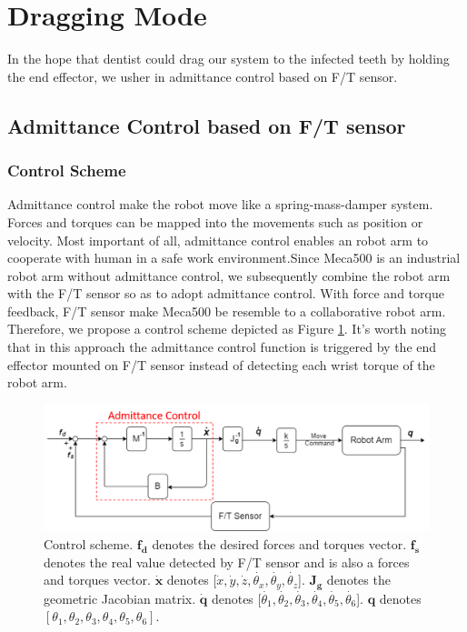 \section{Dragging Mode}
In the hope that dentist could drag our system to the infected teeth by holding the end effector, we usher in admittance control based on F/T sensor.
\subsection{Admittance Control based on F/T sensor}
\label{sec:adm ctrl}
\subsubsection{Control Scheme}
Admittance control make the robot move like a spring-mass-damper system. Forces and torques can be mapped into the movements such as position or velocity. Most important of all, admittance control enables an robot arm to cooperate with human in a safe work environment.Since Meca500 is an industrial robot arm without admittance control, we subsequently combine the robot arm with the F/T sensor so as to adopt admittance control. With force and torque feedback, F/T sensor make Meca500 be resemble to a collaborative robot arm. Therefore, we propose a control scheme depicted as Figure \ref{fig:adm ctrl}. It's worth noting that in this approach the admittance control function is triggered by the end effector mounted on F/T sensor instead of detecting each wrist torque of the robot arm.
\par
\begin{figure}[htbp]
\begin{center}
\includegraphics[width=1\linewidth]{Images/adm ctrl.png}
\end{center}
\caption{
Control scheme. $\boldsymbol{f_d}$ denotes the desired forces and torques vector. $\boldsymbol{f_s}$ denotes the real value detected by F/T sensor and is also a forces and torques vector. $\boldsymbol{\dot{x}}$ denotes [$\dot{x}, \dot{y}, \dot{z}, \dot{\theta _x}, \dot{\theta _y}, \dot{\theta _z}$]. $\mathbf{J_g}$ denotes the geometric Jacobian matrix. $\boldsymbol{\dot{q}}$ denotes [$\dot{\theta _1}, \dot{\theta _2}, \dot{\theta _3}, \dot{\theta _4}, \dot{\theta _5}, \dot{\theta _6}$]. $\boldsymbol{q}$ denotes $\left[\theta _1, \theta _2, \theta _3, \theta _4, \theta _5, \theta _6 \right] $.
}\label{fig:adm ctrl}
\end{figure}
